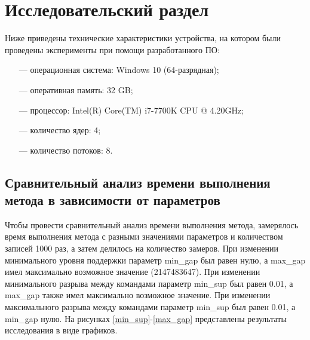 \chapter{Исследовательский раздел}
\label{cha:research}
Ниже приведены технические характеристики устройства, на котором были проведены эксперименты при помощи разработанного ПО:
\begin{itemize}
	\item[---] операционная система: Windows 10 (64-разрядная);
	\item[---] оперативная память: 32 GB;
	\item[---] процессор: Intel(R) Core(TM) i7-7700K CPU @ 4.20GHz;
	\item[---] количество ядер: 4;
	\item[---] количество потоков: 8.
\end{itemize}

\section{Сравнительный анализ времени выполнения метода в зависимости от параметров}

Чтобы провести сравнительный анализ времени выполнения  метода, замерялось время выполнения метода с разными значениями параметров и количеством записей 1000 раз, а затем делилось на количество замеров.
При изменении минимального уровня поддержки параметр min\_gap был равен нулю, а max\_gap имел максимально возможное значение (2147483647).
При изменении минимального разрыва между командами параметр min\_sup был равен 0.01, а max\_gap также имел максимально возможное значение.
При изменении максимального разрыва между командами параметр min\_sup был равен 0.01, а min\_gap нулю.
На рисунках \ref{min_sup}-\ref{max_gap} представлены результаты исследования в виде графиков.

